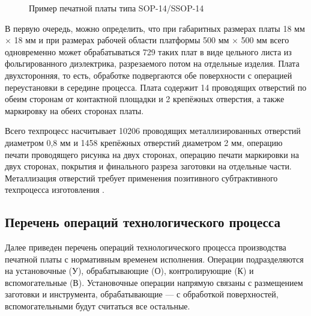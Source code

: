 \begin{figure}[ht]
	\caption{Пример печатной платы типа SOP-14/SSOP-14}\label{fig:sop14}
\end{figure}

В первую очередь, можно определить, что при габаритных размерах платы 18 мм $\times$ 18 мм и при размерах рабочей области платформы 500 мм $\times$ 500 мм всего одновременно может обрабатываться 729 таких плат в виде цельного листа из фольгированного диэлектрика, разрезаемого потом на отдельные изделия. Плата двухсторонняя, то есть, обработке подвергаются обе поверхности с операцией переустановки в середине процесса. Плата содержит 14 проводящих отверстий по обеим сторонам от контактной площадки и 2 крепёжных отверстия, а также маркировку на обеих сторонах платы.

Всего техпроцесс насчитывает 10206 проводящих металлизированных отверстий диаметром 0,8 мм и 1458 крепёжных отверстий диаметром 2 мм, операцию печати проводящего рисунка на двух сторонах, операцию печати маркировки на двух сторонах, покрытия и финального разреза заготовки на отдельные части. Металлизация отверстий требует применения позитивного субтрактивного техпроцесса изготовления \cite{Brusnitsyna}.

\subsection{Перечень операций технологического процесса} \label{ssect2_3_2}

Далее приведен перечень операций технологического процесса производства печатной платы с нормативным временем исполнения. Операции подразделяются на установочные (У), обрабатывающие (О), контролирующие (К) и вспомогательные (В). Установочные операции напрямую связаны с размещением заготовки и инструмента, обрабатывающие --- с обработкой поверхностей, вспомогательными будут считаться все остальные.

